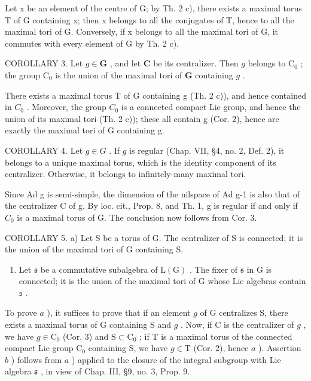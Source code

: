 Let x be an element of the centre of G; by Th. 2 c), there exists a maximal torus T of G containing x; then x belongs to all the conjugates of T, hence to all the maximal tori of G. Conversely, if x belongs to all the maximal tori of G, it commutes with every element of G by Th. 2 c).

COROLLARY 3. Let \(g \in \mathbf{G}\) , and let \(\mathbf{C}\) be its centralizer. Then \(g\) belongs to \(\mathrm{C}_0\) ; the group \(\mathrm{C}_0\) is the union of the maximal tori of \(\mathbf{G}\) containing \(g\) .

There exists a maximal torus T of G containing g (Th. 2 c)), and hence contained in \(C_{0}\) . Moreover, the group \(C_{0}\) is a connected compact Lie group, and hence the union of its maximal tori (Th. 2 c)); these all contain g (Cor. 2), hence are exactly the maximal tori of G containing g.

COROLLARY 4. Let \(g \in G\) . If \(g\) is regular (Chap. VII, §4, no. 2, Def. 2), it belongs to a unique maximal torus, which is the identity component of its centralizer. Otherwise, it belongs to infinitely-many maximal tori.

Since Ad g is semi-simple, the dimension of the nilspace of Ad g-1 is also that of the centralizer C of g. By loc. cit., Prop. 8, and Th. 1, g is regular if and only if \(C_{0}\) is a maximal torus of G. The conclusion now follows from Cor. 3.

COROLLARY 5. a) Let S be a torus of G. The centralizer of S is connected; it is the union of the maximal tori of G containing S.

\begin{enumerate}
\def\labelenumi{\alph{enumi})}
\setcounter{enumi}{1}
\tightlist
\item
  Let \(\mathfrak{s}\) be a commutative subalgebra of \(\mathrm{L}(\mathrm{G})\) . The fixer of \(\mathfrak{s}\) in \(\mathrm{G}\) is connected; it is the union of the maximal tori of \(\mathrm{G}\) whose Lie algebras contain \(\mathfrak{s}\) .
\end{enumerate}

To prove \(a\) ), it suffices to prove that if an element \(g\) of G centralizes S, there exists a maximal torus of G containing S and \(g\) . Now, if C is the centralizer of \(g\) , we have \(g \in \mathrm{C}_0\) (Cor. 3) and \(\mathrm{S} \subset \mathrm{C}_0\) ; if T is a maximal torus of the connected compact Lie group \(\mathrm{C}_0\) containing S, we have \(g \in \mathrm{T}\) (Cor. 2), hence \(a\) ). Assertion \(b\) ) follows from \(a\) ) applied to the closure of the integral subgroup with Lie algebra \(\mathfrak{s}\) , in view of Chap. III, §9, no. 3, Prop. 9.

